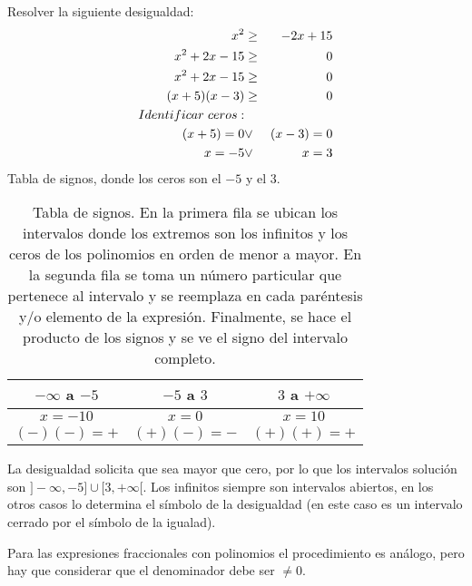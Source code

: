 \begin{myexample}
Resolver la siguiente desigualdad:\\
\begin{eqnarray*}
x^{2}&\geq & -2x+15 \\
x^{2}+2x-15&\geq & 0\\
x^{2}+2x-15&\geq & 0\\
(x+5)(x-3)&\geq & 0\\
Identificar\hspace{3px} ceros: \\
(x+5)=0 &\vee & (x-3)=0\\
x=-5 &\vee & x=3 \\
\end{eqnarray*}
Tabla de signos, donde los ceros son el $-5$ y el $3$.

\begin{center}
	\begin{table}[h!]
	\centering
		\begin{tabular}{|c|c|c|}
\hline
$-\infty$ a $-5$ &$-5$ a $3$ &$3$ a $+\infty$ \\
\hline
$x=-10$ & $x=0$ & $x=10$\\
$(-)(-)=+$ & $(+)(-)=-$ & $(+)(+)=+$ \\
\hline
		\end{tabular}
		\caption[Tabla de signos.]{Tabla de signos. En la primera fila se ubican los intervalos donde los extremos son los infinitos y los ceros de los polinomios en orden de menor a mayor. En la segunda fila se toma un número particular que pertenece al intervalo y se reemplaza en cada paréntesis y/o elemento de la expresión. Finalmente, se hace el producto de los signos y se ve el signo del intervalo completo.}
	\end{table}
\end{center}
La desigualdad solicita que sea mayor que cero, por lo que los intervalos solución son $]-\infty,-5]\cup [3,+\infty[$. Los infinitos siempre son intervalos abiertos, en los otros casos lo determina el símbolo de la desigualdad (en este caso es un intervalo cerrado por el símbolo de la igualad).
\end{myexample}

Para las expresiones fraccionales con polinomios el procedimiento es análogo, pero hay que considerar que el denominador debe ser $\neq 0$.\\

